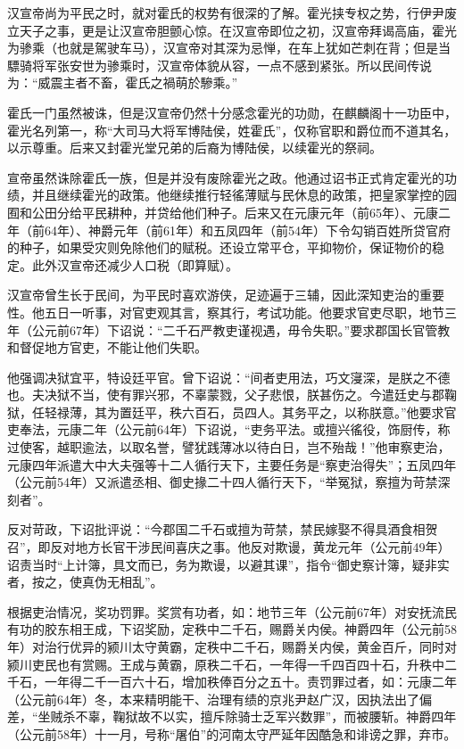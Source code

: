 汉宣帝尚为平民之时，就对霍氏的权势有很深的了解。霍光挟专权之势，行伊尹废立天子之事，更是让汉宣帝胆颤心惊。在汉宣帝即位之初，汉宣帝拜谒高庙，霍光为骖乘（也就是駕驶车马），汉宣帝对其深为忌惮，在车上犹如芒刺在背；但是当驃骑将军张安世为骖乘时，汉宣帝体貌从容，一点不感到紧张。所以民间传说为：“威震主者不畜，霍氏之禍萌於驂乘。”

霍氏一门虽然被诛，但是汉宣帝仍然十分感念霍光的功勋，在麒麟阁十一功臣中，霍光名列第一，称“大司马大将军博陆侯，姓霍氏”，仅称官职和爵位而不道其名，以示尊重。后来又封霍光堂兄弟的后裔为博陆侯，以续霍光的祭祠。

宣帝虽然诛除霍氏一族，但是并没有废除霍光之政。他通过诏书正式肯定霍光的功绩，并且继续霍光的政策。他继续推行轻徭薄赋与民休息的政策，把皇家掌控的园囿和公田分给平民耕种，并贷给他们种子。后来又在元康元年（前65年）、元康二年（前64年）、神爵元年（前61年）和五凤四年（前54年）下令勾销百姓所贷官府的种子，如果受灾则免除他们的赋税。还设立常平仓，平抑物价，保证物价的稳定。此外汉宣帝还减少人口税（即算赋）。

汉宣帝曾生长于民间，为平民时喜欢游侠，足迹遍于三辅，因此深知吏治的重要性。他五日一听事，对官吏观其言，察其行，考试功能。他要求官吏尽职，地节三年（公元前67年）下诏说：“二千石严教吏谨视遇，毋令失职。”要求郡国长官管教和督促地方官吏，不能让他们失职。

他强调决狱宜平，特设廷平官。曾下诏说：“间者吏用法，巧文寖深，是朕之不德也。夫决狱不当，使有罪兴邪，不辜蒙戮，父子悲恨，朕甚伤之。今遣廷史与郡鞠狱，任轻禄薄，其为置廷平，秩六百石，员四人。其务平之，以称朕意。”他要求官吏奉法，元康二年（公元前64年）下诏说，“吏务平法。或擅兴徭役，饰厨传，称过使客，越职逾法，以取名誉，譬犹践薄冰以待白日，岂不殆哉！”他审察吏治，元康四年派遣大中大夫强等十二人循行天下，主要任务是“察吏治得失”；五凤四年（公元前54年）又派遣丞相、御史掾二十四人循行天下，“举冤狱，察擅为苛禁深刻者”。

反对苛政，下诏批评说：“今郡国二千石或擅为苛禁，禁民嫁娶不得具酒食相贺召”，即反对地方长官干涉民间喜庆之事。他反对欺谩，黄龙元年（公元前49年）诏责当时“上计簿，具文而已，务为欺谩，以避其课”，指令“御史察计簿，疑非实者，按之，使真伪无相乱”。

根据吏治情况，奖功罚罪。奖赏有功者，如：地节三年（公元前67年）对安抚流民有功的胶东相王成，下诏奖励，定秩中二千石，赐爵关内侯。神爵四年（公元前58 年）对治行优异的颍川太守黄霸，定秩中二千石，赐爵关内侯，黄金百斤，同时对颍川吏民也有赏赐。王成与黄霸，原秩二千石，一年得一千四百四十石，升秩中二千石，一年得二千一百六十石，增加秩俸百分之五十。责罚罪过者，如：元康二年（公元前64年）冬，本来精明能干、治理有绩的京兆尹赵广汉，因执法出了偏差，“坐贼杀不辜，鞠狱故不以实，擅斥除骑士乏军兴数罪”，而被腰斩。神爵四年（公元前58年）十一月，号称“屠伯”的河南太守严延年因酷急和诽谤之罪，弃市。

